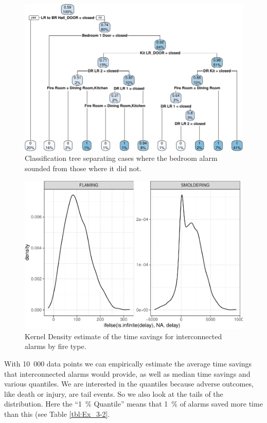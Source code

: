 \documentclass[12pt,twoside]{book}
\begin{document}
\begin{figure}[h!]
\centering
\includegraphics[width=4.5in]{FIGURES/cart-1.pdf}
\caption{Classification tree separating cases where the bedroom alarm sounded from those where it did not.}
\label{Ex_3-classification_tree}
\end{figure}
\begin{figure}[h!]
\centering
\includegraphics[width=4.5in]{FIGURES/kde-1.pdf}
\caption{Kernel Density estimate of the time savings for interconnected alarms by fire type.}
\label{Ex_3-distributions}
\end{figure}

With 10~000 data points we can empirically estimate the average time savings that interconnected alarms would provide, as well as median time savings and various quantiles. We are interested in the quantiles because adverse outcomes, like death or injury, are tail events. So we also look at the tails of the distribution. Here the ``1~\% Quantile'' means that 1~\% of alarms saved more time than this (see Table \ref{tbl:Ex_3-2}.
\end{document}
